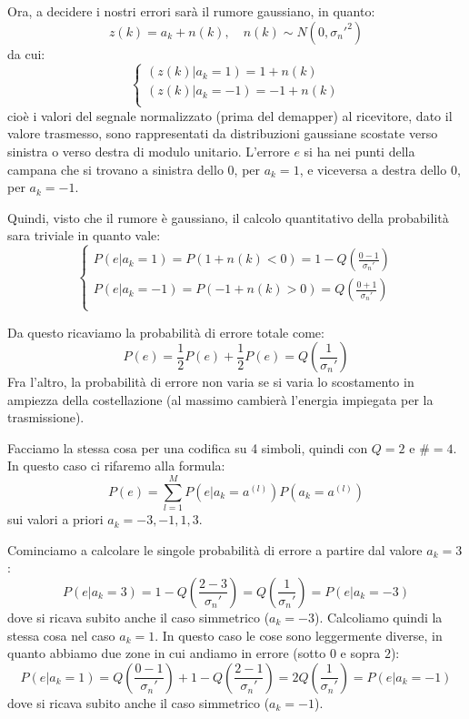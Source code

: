 \documentclass[a4paper,11pt]{article}
\begin{document}
Ora, a decidere i nostri errori sarà il rumore gaussiano, in quanto:
$$
z(k) = a_k + n(k), \quad n(k) \sim N\left( 0, \sigma_n'^2 \right)
$$
da cui:
$$
\begin{cases}
	(z(k) | a_k = 1) = 1 + n(k) \\
	(z(k) | a_k = -1) = -1 + n(k) \\
\end{cases}
$$
cioè i valori del segnale normalizzato (prima del demapper) al ricevitore, dato il valore trasmesso, sono rappresentati da distribuzioni gaussiane scostate verso sinistra o verso destra di modulo unitario.
L'errore $e$ si ha nei punti della campana che si trovano a sinistra dello $0$, per $a_k = 1$, e viceversa a destra dello $0$, per $a_k = -1$.

Quindi, visto che il rumore è gaussiano, il calcolo quantitativo della probabilità sara triviale in quanto vale:
$$
\begin{cases}
P(e | a_k = 1) = P(1 + n(k) < 0) = 1 - Q\left( \frac{0 - 1}{\sigma_n'} \right) \\
P(e | a_k = -1) = P(-1 + n(k) > 0) = Q\left( \frac{0 + 1}{\sigma_n'} \right) \\
\end{cases}
$$

Da questo ricaviamo la probabilità di errore totale come:
$$
P(e) = \frac{1}{2} P(e) + \frac{1}{2} P(e) = Q \left( \frac{1}{\sigma_n'} \right)
$$
Fra l'altro, la probabilità di errore non varia se si varia lo scostamento in ampiezza della costellazione (al massimo cambierà l'energia impiegata per la trasmissione).

\par\smallskip

Facciamo la stessa cosa per una codifica su 4 simboli, quindi con $Q = 2$ e $\# = 4$.
In questo caso ci rifaremo alla formula:
$$
P(e) = \sum_{l=1}^M P(e | a_k = a^{(l)}) P( a_k = a^{(l)} )
$$
sui valori a priori $a_k = -3, -1, 1, 3$. 

Cominciamo a calcolare le singole probabilità di errore a partire dal valore $a_k = 3$:
$$
P(e | a_k = 3) = 1 - Q \left( \frac{2 - 3}{\sigma_n'} \right) = Q \left( \frac{1}{\sigma_n'} \right) = P(e | a_k = -3)
$$
dove si ricava subito anche il caso simmetrico ($a_k = -3$).
Calcoliamo quindi la stessa cosa nel caso $a_k = 1$. In questo caso le cose sono leggermente diverse, in quanto abbiamo due zone in cui andiamo in errore (sotto $0$ e sopra $2$):
$$
P(e | a_k = 1) = Q\left( \frac{0 - 1}{\sigma_n'} \right) + 1 - Q\left( \frac{2 - 1}{\sigma_n'} \right) = 2 Q\left( \frac{1}{\sigma_n'} \right) = P(e | a_k = -1)
$$
dove si ricava subito anche il caso simmetrico ($a_k = -1$).
\end{document}
